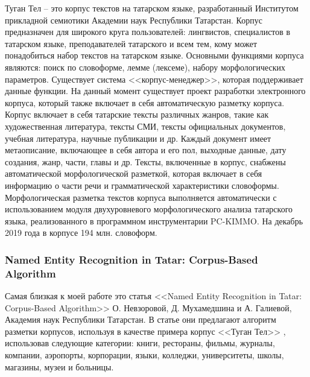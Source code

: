 Туган Тел -- это корпус текстов на татарском языке, разработанный Институтом прикладной
семиотики Академии наук Республики Татарстан. Корпус предназначен для широкого круга 
пользователей: лингвистов, специалистов в татарском языке, преподавателей татарского и всем 
тем, кому может понадобиться набор текстов на татарском языке. Основными функциями корпуса 
являются: поиск  по словоформе, лемме (лексеме), набору морфологических параметров. 
Существует система <<корпус-менеджер>>, которая поддерживает данные функции.  На данный 
момент существует проект разработки электронного корпуса, который также включает в себя 
автоматическую разметку корпуса. Корпус включает в  себя татарские тексты различных жанров, такие как художественная литература, тексты СМИ, тексты официальных документов, учебная литература, научные публикации и др. Каждый документ имеет метаописание, включающее в себя автора и его пол, выходные данные, дату  создания, жанр, части, главы и др. Тексты, включенные в корпус, снабжены автоматической  морфологической разметкой, которая включает в себя информацию о части речи и 
грамматической характеристики словоформы. Морфологическая разметка текстов корпуса 
выполняется автоматически с использованием модуля двухуровневого морфологического анализа 
татарского языка, реализованного в программном инструментарии PC-KIMMO. На 
декабрь 2019 года в корпусе 194 млн. словоформ. 

\subsubsection{Named Entity Recognition in Tatar: Corpus-Based Algorithm}

Самая близкая к моей работе это статья <<Named Entity Recognition in Tatar:
Corpus-Based Algorithm>> О. Невзоровой, Д. Мухамедшина и А. Галиевой, Академия наук Республики Татарстан. В статье они предлагают алгоритм разметки корпусов, используя в качестве примера корпус <<Туган Тел>> \cite{tugan_tel}, использовав следующие категории: книги, рестораны, фильмы, журналы, компании, аэропорты, корпорации, языки, колледжи, университеты, школы, магазины, музеи и больницы. 

